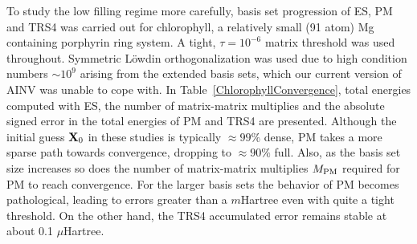 \commentoutA{\documentclass[prb,aps,twocolumn,showpacs,twocolumngrid,superbib]{revtex4}}
\begin{document}
To study the low filling regime more carefully, basis set progression of ES, PM 
and TRS4 was carried out for chlorophyll, a relatively small (91 atom) Mg containing porphyrin ring system. 
A tight,  $\tau=10^{-6}$ matrix threshold was used throughout.  Symmetric L\"owdin orthogonalization 
was used due to high condition numbers $\sim 10^9$ arising from the extended basis sets, which 
our current version of AINV was unable to cope with.  In Table~\ref{ChlorophyllConvergence}, 
total energies computed with ES, the number of matrix-matrix multiplies and the absolute signed 
error in the total energies of PM and TRS4 are presented.  Although the initial guess ${\bf X}_0$ 
in these studies is typically $\approx 99\%$ dense, PM takes a more sparse path towards convergence, 
dropping to $\approx 90\%$ full.  Also, as the basis set size increases so does the number 
of matrix-matrix multiplies $M_{\rm PM}$ required for PM to reach convergence. For the 
larger basis sets the behavior of PM becomes pathological,  leading to errors greater 
than a $m$Hartree even with quite a tight threshold.  On the other hand, the TRS4 accumulated error 
remains stable at about 0.1 $\mu$Hartree.
\end{document}
